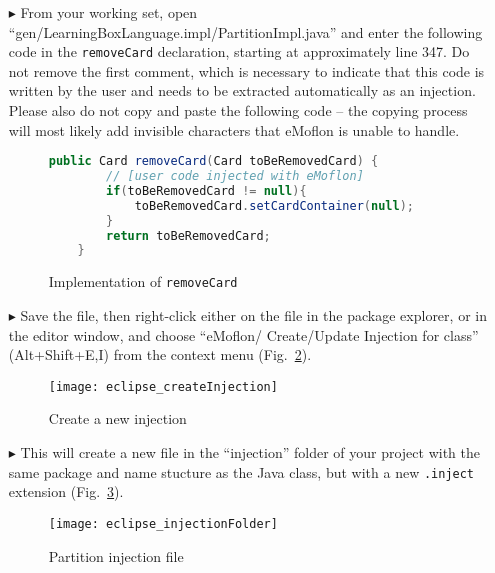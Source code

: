 \begin{itemize}

\item[$\blacktriangleright$] From your working set, open ``gen/LearningBoxLanguage.impl/Part\-it\-ionImpl.java'' and enter the following code in the
\texttt{removeCard} declaration, starting at approximately line 347. Do not remove the first comment, which is necessary to indicate that this code is written
by the user and needs to be extracted automatically as an injection. Please also do not copy and paste the following code -- the copying process will most
likely add invisible characters that eMoflon is unable to handle.

\vspace{0.5cm}

\begin{figure}[htbp]
        \centering
        \begin{lstlisting}[language=Java, keywordstyle={\bfseries\color{purple}}, backgroundcolor=\color{white}]
    public Card removeCard(Card toBeRemovedCard) {
		// [user code injected with eMoflon]
		if(toBeRemovedCard != null){
			toBeRemovedCard.setCardContainer(null);
		}
		return toBeRemovedCard;
	}
        \end{lstlisting}
        \caption{Implementation of \texttt{removeCard}}
        \label{code:addToStringRep_impl}
\end{figure}

\vspace{0.5cm}

\item[$\blacktriangleright$] Save the file, then right-click either on the file in the package explorer, or in the editor window, and choose ``eMoflon/
Create/Update Injection for class'' (Alt+Shift+E,I) from the context menu (Fig.~\ref{eclipse:injection_create_injection}).

\begin{figure}[htbp]
    \centering
    \texttt{[image: eclipse\_createInjection]}
    \caption{Create a new injection}
    \label{eclipse:injection_create_injection}
\end{figure}

\item[$\blacktriangleright$] This will create a new file in the ``injection'' folder of your project with the same package and name stucture as the Java class,
but with a new \texttt{.inject} extension (Fig.~\ref{eclipse:injection_folder}).

\begin{figure}[htbp]
    \centering
    \texttt{[image: eclipse\_injectionFolder]}
    \caption{Partition injection file}
    \label{eclipse:injection_folder}
\end{figure}


\end{itemize}
